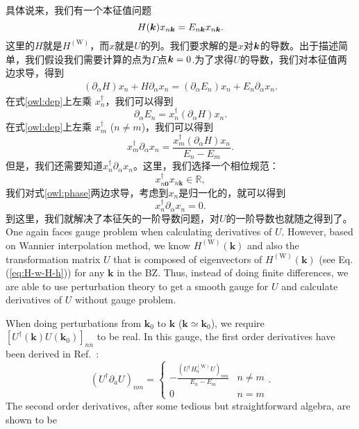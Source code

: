 具体说来，我们有一个本征值问题
\begin{equation}
H(\boldsymbol{k})x_{n\boldsymbol{k}} = E_{n\boldsymbol{k}}x_{n\boldsymbol{k}}.
\end{equation}
这里的$H$就是$H^{\mathrm{(W)}}$，而$x$就是$U$的列。我们要求解的是$x$对$\boldsymbol{k}$的导数。出于描述简单，我们假设我们需要计算的点为$\Gamma$点$\boldsymbol{k}=0$.为了求得$U$的导数，我们对本征值两边求导，得到
\begin{align}
(\partial_\alpha H) x_n+H \partial_\alpha x_n = (\partial_\alpha E_n) x_n + E_n \partial_\alpha x_n.\label{owl:dep}
\end{align}
在式\ref{owl:dep}上左乘 $x_n^\dagger$，我们可以得到
\begin{equation}
\partial_\alpha E_{n}=x_{n}^{\dagger}(\partial_\alpha H) x_{n}.
\end{equation}
在式\ref{owl:dep}上左乘 $x_m^\dagger$ ($n\ne m$)，我们可以得到
\begin{equation}
x_{m}^{\dagger}\partial_\alpha x_{n}=\frac{x_{m}^{\dagger}(\partial_\alpha H)x_{n}}{E_n-E_m}.
\end{equation}
但是，我们还需要知道$x_{n}^{\dagger}\partial_\alpha x_{n}$。这里，我们选择一个相位规范：
\begin{equation}
x_{n\boldsymbol{0}}^{\dagger} x_{n\boldsymbol{k}}\in\mathbb{R},\label{owl:phase}
\end{equation}
我们对式\ref{owl:phase}两边求导，考虑到$x_n$是归一化的，就可以得到
\begin{equation}
x_{n}^{\dagger}\partial_\alpha x_n=0.
\end{equation}
到这里，我们就解决了本征矢的一阶导数问题，对$U$的一阶导数也就随之得到了。
One again faces gauge problem when calculating derivatives of $U$. However, based on Wannier interpolation method, we know $H^{(\textrm{W})}(\mathbf{k})$ and also the transformation matrix $U$ that is composed of eigenvectors of $H^{(\textrm{W})}(\mathbf{k})$ (see Eq. (\ref{eq:H-w-H-h})) for any $\mathbf{k}$ in the BZ. Thus, instead of doing finite differences, we are able to use perturbation theory to get a smooth gauge for $U$ and calculate derivatives of  $U$ without gauge problem. 

When doing perturbations from $\mathbf{k}_{0}$ to $\mathbf{k}$ ($\mathbf{k}\simeq\mathbf{k}_{0}$), we require $[U^{\dagger}(\mathbf{k})U(\mathbf{k}_{0})]_{nn}$ to be real. In this gauge, the first order derivatives have been derived in Ref.~:
\[
(U^{\dagger}\partial_{a}U)_{nm}=\begin{cases}
-\frac{(U^{\dagger}H_{a}^{(\textrm{W})}U)_{nm}}{E_{n}-E_{m}} & n\neq m\\
0 & n=m
\end{cases}.
\]
The second order derivatives, after some tedious but straightforward algebra, are shown to be 

